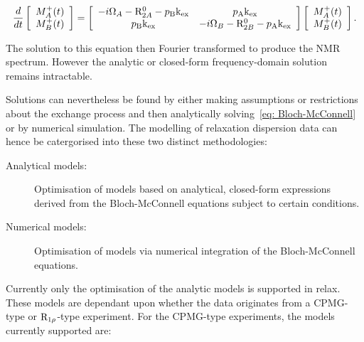\begin{equation} \label{eq: Bloch-McConnell}
    \frac{d}{dt} \left[ 
        \begin{array}{c}
            M_A^+(t) \\
            M_B^+(t)
        \end{array}
    \right] = \left[
        \begin{array}{cc}
            -i\Omega_A-\mathrm{R}_{2A}^0-p_\textrm{B}\textrm{k}_\textrm{ex} & p_\textrm{A}\textrm{k}_\textrm{ex} \\
            p_\textrm{B}\textrm{k}_\textrm{ex} & -i\Omega_B-\mathrm{R}_{2B}^0-p_\textrm{A}\textrm{k}_\textrm{ex} \\
        \end{array}
    \right] \left[
        \begin{array}{c}
            M_A^+(t) \\
            M_B^+(t)
        \end{array}
    \right] .
\end{equation}

The solution to this equation then Fourier transformed to produce the NMR spectrum.  However the analytic or closed-form frequency-domain solution remains intractable.

Solutions can nevertheless be found by either making assumptions or restrictions about the exchange process and then analytically solving~\ref{eq: Bloch-McConnell} or by numerical simulation.
The modelling of relaxation dispersion data can hence be catergorised into these two distinct methodologies:

\begin{description}
\item[Analytical models:]  Optimisation of models based on analytical, closed-form expressions derived from the Bloch-McConnell equations subject to certain conditions.
\item[Numerical models:]  Optimisation of models via numerical integration of the Bloch-McConnell equations.
\end{description}

Currently only the optimisation of the analytic models is supported in relax.
These models are dependant upon whether the data originates from a CPMG-type or $\mathrm{R}_{1\rho}$-type experiment.
For the CPMG-type experiments, the models currently supported are:

